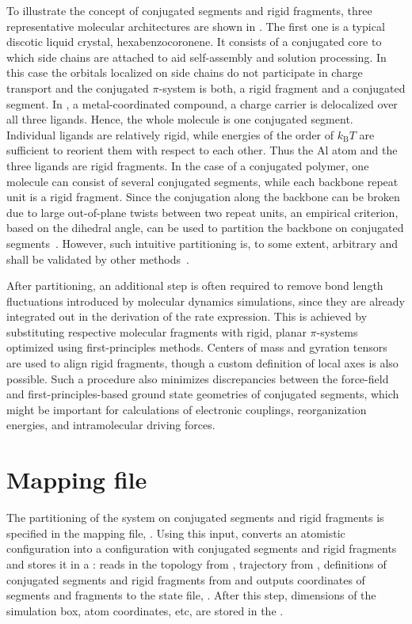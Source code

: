 To illustrate the concept of conjugated segments and rigid fragments, three representative molecular architectures are shown in . The first one is a typical discotic liquid crystal, hexabenzocoronene. It consists of a conjugated core to which side chains are attached to aid self-assembly and solution processing. In this case the orbitals localized on side chains do not participate in charge transport and the conjugated $\pi$-system is both, a rigid fragment and a conjugated segment. 
%
In \Alq, a metal-coordinated compound, a charge carrier is delocalized over all three ligands. Hence, the whole molecule is one conjugated segment. Individual ligands are relatively rigid, while energies of the order of $k_\text{B}T$ are sufficient to reorient them with respect to each other. Thus the Al atom and the three ligands are rigid fragments.
%
In the case of a conjugated polymer, one molecule can consist of several conjugated segments, while each backbone repeat unit is a rigid fragment. Since the conjugation along the backbone can be broken due to large out-of-plane twists between two repeat units, an empirical criterion, based on the dihedral angle, can be used to partition the backbone on conjugated segments~\cite{ruhle_multiscale_2010}. However, such intuitive partitioning is, to some extent, arbitrary and shall be validated by other methods~\cite{vukmirovic_charge_2008,vukmirovic_charge_2009,mcmahon_ad_2009}. 

After partitioning, an additional step is often required to remove bond length fluctuations introduced by molecular dynamics simulations, since they are already integrated out in the derivation of the rate expression. This is achieved by substituting respective molecular fragments with  rigid, planar $\pi$-systems optimized using first-principles methods. Centers of mass and gyration tensors are used to align rigid fragments, though a custom definition of local axes is also possible. Such a procedure also minimizes discrepancies between the force-field and first-principles-based ground state geometries of conjugated segments, which might be important for calculations of electronic couplings, reorganization energies, and intramolecular driving forces. 

\section{Mapping file}
\label{sec:xmlmap}
The partitioning of the system on conjugated segments and rigid fragments is specified in the mapping file, \xmlcsg. Using this input, \ctpmap converts an atomistic configuration into a configuration with conjugated segments and rigid fragments and stores it in a :
%
%
\ctpmap reads in the \gromacs topology from \topology, trajectory from \trajectory, definitions of conjugated segments and rigid fragments from \xmlcsg and outputs coordinates of segments and fragments to the state file, \sqlstate. After this step, dimensions of the simulation box, atom coordinates, etc, are stored in the .

